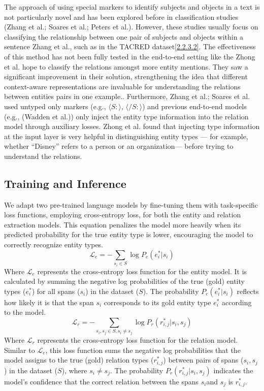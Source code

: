 The approach of using special markers to identify subjects and objects in a text is not particularly novel and has been explored before in classification studies (Zhang et al.\cite{zhang-etal-2019-ernie}; Soares et al.\cite{baldini-soares-etal-2019-matching}; Peters et al.\cite{peters2019knowledge}). However, these studies usually focus on classifying the relationship between one pair of subjects and objects within a sentence Zhang et al.\cite{zhang-etal-2017-position}, such as in the TACRED dataset\hyperref[sec:tacreddataset]{[2.2.3.2]}. The effectiveness of this method has not been fully tested in the end-to-end setting like the Zhong et al. \cite{Zhong2020AFE} hope to classify the relations amongst more entity mentions. They saw a significant improvement in their solution, strengthening the idea that different context-aware representations are invaluable for understanding the relations between entities pairs in one example.. Furthermore, Zhang et al.\cite{zhang-etal-2019-ernie}; Soares et al.\cite{baldini-soares-etal-2019-matching} used untyped only markers (e.g., \(\langle S:\rangle\), \(\langle /S:\rangle\)) and previous end-to-end models (e.g., (Wadden et al.\cite{Wadden2019EntityRA})) only inject the entity type information into the relation model through auxiliary losses. Zhong et al. \cite{Zhong2020AFE} found that injecting type information at the input layer is very helpful in distinguishing entity types — for example, whether “Disney” refers to a person or an organization— before trying to understand the relations.

\subsection{Training and Inference}
\label{sec:trainingandinference}
We adapt two pre-trained language models by fine-tuning them with task-specific loss functions, employing cross-entropy loss\cite{Zhong2020AFE}, for both the entity and relation extraction models. This equation penalizes the model more heavily when its predicted probability for the true entity type is lower, encouraging the model to correctly recognize entity types.
\[\mathcal{L}_e=-\sum_{s_i\in S}\log{P_e(e_i^*|s_i)}\]
Where \(\mathcal{L}_e\) represents the cross-entropy loss function for the entity model. It is calculated by summing the negative log probabilities of the true (gold) entity types (\(e_i^*\)) for all spans (\(s_i\)) in the dataset (\(S\)). The probability \(P_e(e_i^*|s_i)\) reflects how likely it is that the span \(s_i\) corresponds to its gold entity type \(e_i^*\) according to the model.
\[\mathcal{L}_r=-\sum_{s_i,s_j\in S, s_i \neq s_j}\log{P_r(r_{i,j}^*|s_i,s_j)}\]
Where \(\mathcal{L}_r\) represents the cross-entropy loss function for the relation model. Similar to \(\mathcal{L}_e\), this loss function sums the negative log probabilities that the model assigns to the true (gold) relation types (\(r_{i,j}^*\)) between pairs of spans (\(s_i,s_j\)) in the dataset (\(S\)), where \(s_i \neq s_j\). The probability \(P_r(r_{i,j}^*|s_i,s_j)\) indicates the model's confidence that the correct relation between the spans \(s_i\)and  \(s_j\) is \(r_{i,j}^*\).

